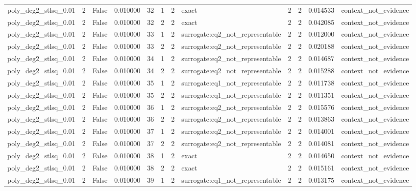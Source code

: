 \begin{tabular}{lrrrrrrlrrrl}
poly\_deg2\_stlsq\_0.01 & 2 & False & 0.010000 & 32 & 1 & 2 & exact & 2 & 2 & 0.014533 & context\_not\_evidence \\
poly\_deg2\_stlsq\_0.01 & 2 & False & 0.010000 & 32 & 2 & 2 & exact & 2 & 2 & 0.042085 & context\_not\_evidence \\
poly\_deg2\_stlsq\_0.01 & 2 & False & 0.010000 & 33 & 1 & 2 & surrogate:eq2\_not\_representable & 2 & 2 & 0.012000 & context\_not\_evidence \\
poly\_deg2\_stlsq\_0.01 & 2 & False & 0.010000 & 33 & 2 & 2 & surrogate:eq2\_not\_representable & 2 & 2 & 0.020188 & context\_not\_evidence \\
poly\_deg2\_stlsq\_0.01 & 2 & False & 0.010000 & 34 & 1 & 2 & surrogate:eq2\_not\_representable & 2 & 2 & 0.014687 & context\_not\_evidence \\
poly\_deg2\_stlsq\_0.01 & 2 & False & 0.010000 & 34 & 2 & 2 & surrogate:eq2\_not\_representable & 2 & 2 & 0.015288 & context\_not\_evidence \\
poly\_deg2\_stlsq\_0.01 & 2 & False & 0.010000 & 35 & 1 & 2 & surrogate:eq1\_not\_representable & 2 & 2 & 0.011738 & context\_not\_evidence \\
poly\_deg2\_stlsq\_0.01 & 2 & False & 0.010000 & 35 & 2 & 2 & surrogate:eq1\_not\_representable & 2 & 2 & 0.011351 & context\_not\_evidence \\
poly\_deg2\_stlsq\_0.01 & 2 & False & 0.010000 & 36 & 1 & 2 & surrogate:eq2\_not\_representable & 2 & 2 & 0.015576 & context\_not\_evidence \\
poly\_deg2\_stlsq\_0.01 & 2 & False & 0.010000 & 36 & 2 & 2 & surrogate:eq2\_not\_representable & 2 & 2 & 0.013863 & context\_not\_evidence \\
poly\_deg2\_stlsq\_0.01 & 2 & False & 0.010000 & 37 & 1 & 2 & surrogate:eq2\_not\_representable & 2 & 2 & 0.014001 & context\_not\_evidence \\
poly\_deg2\_stlsq\_0.01 & 2 & False & 0.010000 & 37 & 2 & 2 & surrogate:eq2\_not\_representable & 2 & 2 & 0.014081 & context\_not\_evidence \\
poly\_deg2\_stlsq\_0.01 & 2 & False & 0.010000 & 38 & 1 & 2 & exact & 2 & 2 & 0.014650 & context\_not\_evidence \\
poly\_deg2\_stlsq\_0.01 & 2 & False & 0.010000 & 38 & 2 & 2 & exact & 2 & 2 & 0.015161 & context\_not\_evidence \\
poly\_deg2\_stlsq\_0.01 & 2 & False & 0.010000 & 39 & 1 & 2 & surrogate:eq1\_not\_representable & 2 & 2 & 0.013175 & context\_not\_evidence \\

\end{tabular}
